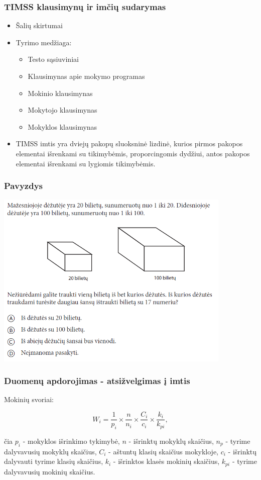 \documentclass[utf8,hyperref={unicode,pdftex}]{beamer}
\begin{document}
\begin{frame}
\frametitle{TIMSS klausimynų ir imčių sudarymas}
\begin{itemize}
\item Šalių skirtumai
\item Tyrimo medžiaga:
\begin{itemize}
\item Testo sąsiuviniai
\item Klausimynas apie mokymo programas
\item Mokinio klausimynas
\item Mokytojo klausimynas
\item Mokyklos klausimynas
\end{itemize}
\item TIMSS imtis yra dviejų pakopų sluoksninė lizdinė, kurios pirmos pakopos elementai išrenkami su tikimybėmis, proporcingomis dydžiui, antos pakopos elementai išrenkami su lygiomis tikimybėmis.
\end{itemize}
\end{frame}

\begin{frame}
\frametitle{Pavyzdys}
\includegraphics[height=8.5cm]{uzdPvz1.png}
\end{frame}

\begin{frame}
\frametitle{Duomenų apdorojimas - atsižvelgimas į imtis}
Mokinių svoriai:
\begin{Large}
\begin{equation}
W_i = \frac{1}{p_i}\times \frac{n}{n_i} \times \frac{C_i}{c_i} \times \frac{k_i}{k_{pi}},
\end{equation}
\end{Large}
čia $p_i$ - mokyklos išrinkimo tykimybė, $n$ - išrinktų mokyklų skaičius, $n_p$ - tyrime dalyvavusių mokyklų skaičius, $C_i$ - aštuntų klasių skaičius mokykloje, $c_i$ - išrinktų dalyvauti tyrime klasių skaičius, $k_i$ - išrinktos klasės mokinių skaičius, $k_{pi}$ - tyrime dalyvavusių mokinių skaičius.
\end{frame}
\end{document}
